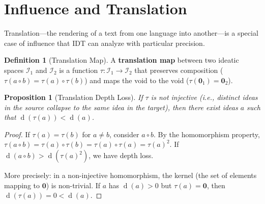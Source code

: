 \documentclass[11pt,openany]{book}
\theoremstyle{definition}
\newtheorem{definition}[axiom]{Definition}
\theoremstyle{plain}
\newtheorem{proposition}[axiom]{Proposition}
\theoremstyle{remark}
\newcommand{\IS}{\mathcal{I}}               %
\newcommand{\compose}{\circ}                 %
\newcommand{\void}{\mathbf{0}}              %
\newcommand{\depth}{\operatorname{d}}       %
\begin{document}
\section{Influence and Translation}

Translation---the rendering of a text from one language into another---is a special case of influence that IDT can analyze with particular precision.

\begin{definition}[Translation Map]
A \textbf{translation map} between two ideatic spaces $\IS_1$ and $\IS_2$ is a function $\tau : \IS_1 \to \IS_2$ that preserves composition ($\tau(a \compose b) = \tau(a) \compose \tau(b)$) and maps the void to the void ($\tau(\void_1) = \void_2$).
\end{definition}

\begin{proposition}[Translation Depth Loss]
If $\tau$ is not injective (i.e., distinct ideas in the source collapse to the same idea in the target), then there exist ideas $a$ such that $\depth(\tau(a)) < \depth(a)$.
\end{proposition}

\begin{proof}
If $\tau(a) = \tau(b)$ for $a \neq b$, consider $a \compose b$. By the homomorphism property, $\tau(a \compose b) = \tau(a) \compose \tau(b) = \tau(a) \compose \tau(a) = \tau(a)^2$. If $\depth(a \compose b) > \depth(\tau(a)^2)$, we have depth loss.

More precisely: in a non-injective homomorphism, the kernel (the set of elements mapping to $\void$) is non-trivial. If $a$ has $\depth(a) > 0$ but $\tau(a) = \void$, then $\depth(\tau(a)) = 0 < \depth(a)$.
\end{proof}
\end{document}
